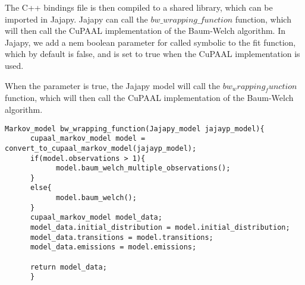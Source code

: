 The C++ bindings file is then compiled to a shared library, which can be imported in Jajapy.
Jajapy can call the $bw\_wrapping\_function$ function, which will then call the CuPAAL implementation of the Baum-Welch algorithm.
In Jajapy, we add a nem boolean parameter for called symbolic to the fit function, which by default is false, and is set to true when the CuPAAL implementation is used.

When the parameter is true, the Jajapy model will call the $bw_wrapping_function$ function, which will then call the CuPAAL implementation of the Baum-Welch algorithm.


\begin{lstlisting}[style=mymatstyle, caption={The C++ function that wraps the CuPAAL implementation of the Baum-Welch algorithm.}, label={lst:cupaal-bw-wrapping-function}]
Markov_model bw_wrapping_function(Jajapy_model jajayp_model){
      cupaal_markov_model model = convert_to_cupaal_markov_model(jajayp_model);
      if(model.observations > 1){
            model.baum_welch_multiple_observations();
      }
      else{
            model.baum_welch();
      }
      cupaal_markov_model model_data;
      model_data.initial_distribution = model.initial_distribution;
      model_data.transitions = model.transitions;
      model_data.emissions = model.emissions;
      
      return model_data;
      }
\end{lstlisting}
